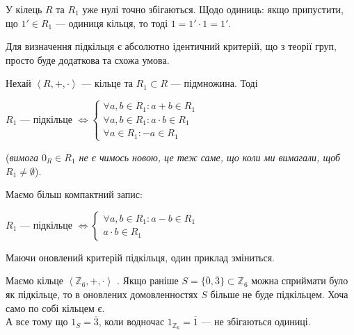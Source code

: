 \documentclass{math_library}
\begin{document}
\begin{remark*}
У кілець $R$ та $R_1$ уже нулі точно збігаються. Щодо одиниць: якщо припустити, що $1' \in R_1$ --- одиниця кільця, то тоді $1 = 1' \cdot 1 = 1'$.
\end{remark*}

Для визначення підкільця є абсолютно ідентичний критерій, що з теорії груп, просто буде додаткова та схожа умова.

\begin{theorem*}
Нехай $\left<R,+, \cdot \right>$ --- кільце та $R_1 \subset R$ --- підмножина. Тоді
\begin{center}
$R_1$ --- підкільце $\iff \begin{cases} \forall a,b \in R_1: a+b \in R_1 \\ \forall a,b \in R_1: a \cdot b \in R_1 \\ \forall a \in R_1: -a \in R_1 \end{cases}$ \color{red}{та $0_R,1_R \in R_1$.}
\end{center}
(\textit{вимога $0_R \in R_1$ не є чимось новою, це теж саме, що коли ми вимагали, щоб $R_1 \neq \emptyset$}).\\
\end{theorem*}

\begin{corollary*}
Маємо більш компактний запис:
\begin{center}
$R_1$ --- підкільце $\iff \begin{cases} \forall a,b \in R_1: a-b \in R_1 \\ a \cdot b \in R_1 \end{cases}$ \color{red}{та $0_R,1_R \in R_1$.}
\end{center}
\end{corollary*}

Маючи оновлений критерій підкільця, один приклад зміниться.

\begin{example*}
Маємо кільце $\left< \mathbb{Z}_6, +, \cdot \right>$ . Якщо раніше $S = \{\overline{0}, \overline{3}\} \subset \mathbb{Z}_6$ можна сприймати було як підкільце, то в оновлених домовленностях $S$ більше не буде підкільцем. Хоча само по собі кільцем є.\\
А все тому що $1_S = \overline{3}$, коли водночас $1_{\mathbb{Z}_6} = \overline{1}$ --- не збігаються одиниці.
\end{example*}
\end{document}
